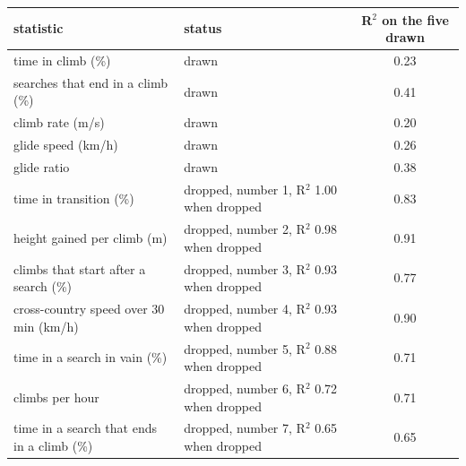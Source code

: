 \begin{tabular}{@{}l l c@{}}
\toprule
statistic & status & R$^2$ on the five drawn \\
\midrule
time in climb (\%) & drawn & 0.23 \\
searches that end in a climb (\%) & drawn & 0.41 \\
climb rate (m/s) & drawn & 0.20 \\
glide speed (km/h) & drawn & 0.26 \\
glide ratio & drawn & 0.38 \\
time in transition (\%) & dropped, number 1, R$^2$ 1.00 when dropped & 0.83 \\
height gained per climb (m) & dropped, number 2, R$^2$ 0.98 when dropped & 0.91 \\
climbs that start after a search (\%) & dropped, number 3, R$^2$ 0.93 when dropped & 0.77 \\
cross-country speed over 30 min (km/h) & dropped, number 4, R$^2$ 0.93 when dropped & 0.90 \\
time in a search in vain (\%) & dropped, number 5, R$^2$ 0.88 when dropped & 0.71 \\
climbs per hour & dropped, number 6, R$^2$ 0.72 when dropped & 0.71 \\
time in a search that ends in a climb (\%) & dropped, number 7, R$^2$ 0.65 when dropped & 0.65 \\
\bottomrule
\end{tabular}
